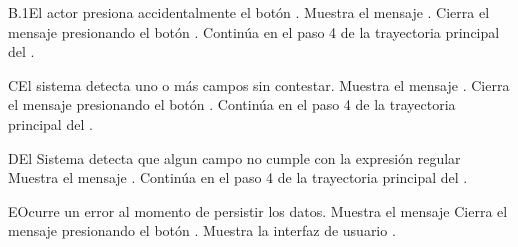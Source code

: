 \begin{UCtrayectoriaA}{B.1}{El actor presiona accidentalmente el botón .}
    \UCpaso Muestra el mensaje .
    \UCpaso[\UCactor] Cierra el mensaje presionando el botón .
    \UCpaso Continúa en el paso 4 de la trayectoria principal del .
\end{UCtrayectoriaA}
\begin{UCtrayectoriaA}{C}{El sistema detecta uno o más campos sin contestar.}
    \UCpaso Muestra el mensaje .
    \UCpaso[\UCactor] Cierra el mensaje presionando el botón .
    \UCpaso Continúa en el paso 4 de la trayectoria principal del .
\end{UCtrayectoriaA}
\begin{UCtrayectoriaA}{D}{El Sistema detecta que algun campo no cumple con la expresión regular}
    \UCpaso Muestra el mensaje .
    \UCpaso Continúa en el paso 4 de la trayectoria principal del .
\end{UCtrayectoriaA}
\begin{UCtrayectoriaA}{E}{Ocurre un error al momento de persistir los datos.}
    \UCpaso Muestra el mensaje 
    \UCpaso[\UCactor] Cierra el mensaje presionando el botón .
    \UCpaso Muestra la interfaz de usuario .
\end{UCtrayectoriaA}
